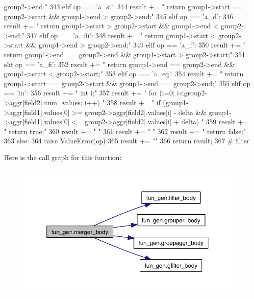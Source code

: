 \begin{DoxyCode}
{       group2->end;\n"
343     elif op == 'a_si':
344         result += "    return group1->start == group2->start && group1->end >
       group2->end;\n"
345     elif op == 'a_d':
346         result += "    return group1->start > group2->start && group1->end <
       group2->end;\n"
347     elif op == 'a_di':
348         result += "    return group1->start < group2->start && group1->end >
       group2->end;\n"
349     elif op == 'a_f':
350         result += "    return group1->end == group2->end && group1->start >
       group2->start;\n"
351     elif op == 'a_fi':
352         result += "    return group1->end == group2->end && group1->start <
       group2->start;\n"
353     elif op == 'a_eq':
354         result += "    return group1->start == group2->start && group1->end ==
       group2->end;\n"
355     elif op == 'in':
356         result += "    int i;\n"
357         result += "    for (i=0; i<group2->aggr[field2].num_values; i++) {\n"
358         result += "        if (group1->aggr[field1].values[0] >=
       group2->aggr[field2].values[i] - delta && group1->aggr[field1].values[0] <=
       group2->aggr[field2].values[i] + delta) {\n"
359         result += "            return true;\n"
360         result += "        }\n"
361         result += "    }\n"
362         result += "    return false;\n"
363     else:
364         raise ValueError(op)
365     result += "}\n\n"
366     return result;
367 
# filter
\end{DoxyCode}


\-Here is the call graph for this function\-:
\nopagebreak
\begin{figure}[H]
\begin{center}
\leavevmode
\includegraphics[width=350pt]{namespacefun__gen_ac739eab321bbc8f1a6e257754772409c_cgraph}
\end{center}
\end{figure}


